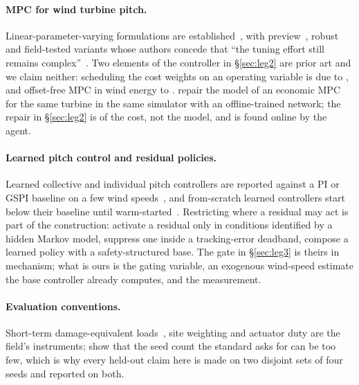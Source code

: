 \documentclass{article}
\begin{document}
\paragraph{MPC for wind turbine pitch.} Linear-parameter-varying formulations are established~\citep{Soliman2011mpc,Koerber2013mpc,Mulders2020qlpv}, with preview~\citep{Schlipf2013nmpc}, robust~\citep{Evans2015rmpc,Klein2025robustmpc} and field-tested variants whose authors concede that ``the tuning effort still remains complex''~\citep{Klein2025robustmpc,Wintermeyer2023challenges}. Two elements of the controller in §\ref{sec:leg2} are prior art and we claim neither: scheduling the cost weights on an operating variable is due to \citet{Wintermeyer2021weightsched}, and offset-free MPC in wind energy to \citet{Liu2024offsetfree}. \citet{Anand2026adaptive} repair the model of an economic MPC for the same turbine in the same simulator with an offline-trained network; the repair in §\ref{sec:leg2} is of the cost, not the model, and is found online by the agent.

\paragraph{Learned pitch control and residual policies.} Learned collective and individual pitch controllers are reported against a PI or GSPI baseline on a few wind speeds~\citep{SierraGarcia2020,Xie2023rlpitch,Coquelet2022ipc,Baseline2026,Espinoza2026ddqn}, and from-scratch learned controllers start below their baseline until warm-started~\citep{Nilsen2026expert}. Restricting where a residual may act is part of the construction: \citet{Abbas2026specialized,Abbas2023specializedarxiv} activate a residual only in conditions identified by a hidden Markov model, \citet{Kim2026stabilityaware} suppress one inside a tracking-error deadband, \citet{Cao2026autosafe} compose a learned policy with a safety-structured base. The gate in §\ref{sec:leg3} is theirs in mechanism; what is ours is the gating variable, an exogenous wind-speed estimate the base controller already computes, and the measurement.

\paragraph{Evaluation conventions.} Short-term damage-equivalent loads~\citep{IEC61400,fatpack}, site weighting and actuator duty are the field's instruments; \citet{Requate2020evaluation} show that the seed count the standard asks for can be too few, which is why every held-out claim here is made on two disjoint sets of four seeds and reported on both.
\end{document}
